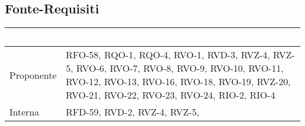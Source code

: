 \subsection{Fonte-Requisiti}
\renewcommand{\arraystretch}{1.5}
\begin{xltabular}{\textwidth}{|x| X |}
    \hline
     \textbf{\textcolor{white}{Fonte}} & \textbf{\textcolor{white}{Requisiti}}\\
    \hline
    \endhead
    Proponente & RFO-58, \newline
                RQO-1, \newline
                RQO-4, \newline
                RVO-1, \newline
                RVD-3, \newline
                RVZ-4, \newline
                RVZ-5, \newline
                RVO-6, \newline
                RVO-7, \newline
                RVO-8, \newline
                RVO-9, \newline
                RVO-10, \newline
                RVO-11, \newline
                RVO-12, \newline
                RVO-13, \newline
                RVO-16, \newline
                RVO-18, \newline
                RVO-19, \newline
                RVZ-20, \newline
                RVO-21, \newline
                RVO-22, \newline
                RVO-23, \newline
                RVO-24, \newline
                RIO-2, \newline
                RIO-4 \\
    \hline
     Interna & RFD-59, \newline 
                RVD-2, \newline 
                RVZ-4, \newline
                RVZ-5, \newline

\end{xltabular}
